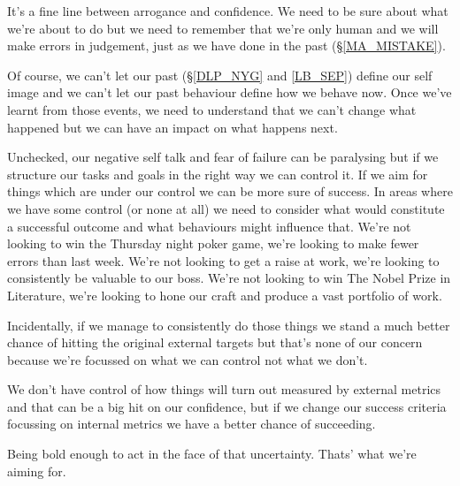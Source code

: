 \cleardoublepage
{\small

It's a fine line between arrogance and confidence. We need to be sure about what we're about to do but we need to remember that we're only human and we will make errors in judgement, just as we have done in the past (\S \ref{MA_MISTAKE}). 

Of course, we can't let our past (\S \ref{DLP_NYG} and \ref{LB_SEP}) define our self image and we can't let our past behaviour define how we behave now. Once we've learnt from those events, we need to understand that we can't change what happened but we can have an impact on what happens next.

Unchecked, our negative self talk and fear of failure can be paralysing but if we structure our tasks and goals in the right way we can control it. If we aim for things which are under our control we can be more sure of success. In areas where we have some control (or none at all) we need to consider what would constitute a successful outcome and what behaviours might influence that. We're not looking to win the Thursday night poker game, we're looking to make fewer errors than last week. We're not looking to get a raise at work, we're looking to consistently be valuable to our boss. We're not looking to win The Nobel Prize in Literature, we're looking to hone our craft and produce a vast portfolio of work.

Incidentally, if we manage to consistently do those things we stand a much better chance of hitting the original external targets but that's none of our concern because we're focussed on what we can control not what we don't.

We don't have control of how things will turn out measured by external metrics and that can be a big hit on our confidence, but if we change our success criteria focussing on internal metrics we have a better chance of succeeding. 

Being bold enough to act in the face of that uncertainty. Thats' what we're aiming for.



}
